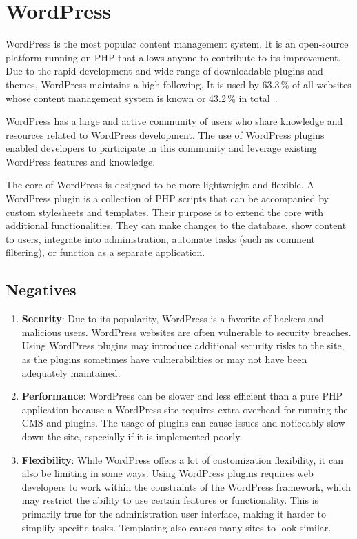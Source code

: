 \documentclass[
  digital,     %
  oneside,     %
  nosansbold,  %
  colorbold, %
  lof,         %
  lot,         %
]{fithesis4}
\begin{document}
\section{WordPress}
\label{sect:wordpress}

WordPress is the most popular content management system. It is an \mbox{open-source}
platform running on PHP that allows anyone to contribute to its improvement.
Due to the rapid development and wide range of downloadable plugins and themes,
WordPress maintains a high following. It is used by 63.3\,\% of all websites whose
content management system is known or 43.2\,\% in total~\cite{w3_wordpress}.

WordPress has a large and active community of users who share knowledge and
resources related to WordPress development. The use of WordPress plugins
enabled developers to participate in this community and leverage existing
WordPress features and knowledge.

The core of WordPress is designed to be more lightweight and flexible. A WordPress
plugin is a collection of PHP scripts that can be accompanied by custom stylesheets
and templates. Their purpose is to extend the core with additional functionalities.
They can make changes to the database, show content to users, integrate into
administration, automate tasks (such as comment filtering), or function as
a separate application.

\subsection{Negatives}

\begin{enumerate}
	
	\item \textbf{Security}: Due to its popularity, WordPress is a favorite of hackers
and malicious users. WordPress websites are often vulnerable to security breaches.
Using WordPress plugins may introduce additional security risks to the site, as the
plugins sometimes have vulnerabilities or may not have been adequately maintained.
	
	\item \textbf{Performance}: WordPress can be slower and less efficient than a pure
PHP application because a WordPress site requires extra overhead for running the CMS
and plugins. The usage of plugins can cause issues and noticeably slow down the site,
especially if it is implemented poorly.
	
	\item \textbf{Flexibility}: While WordPress offers a lot of customization flexibility,
it can also be limiting in some ways. Using WordPress plugins requires web developers
to work within the constraints of the WordPress framework, which may restrict the
ability to use certain features or functionality. This is primarily true for the administration
user interface, making it harder to simplify specific tasks. Templating also causes many
sites to look similar.

\end{enumerate}
\end{document}
